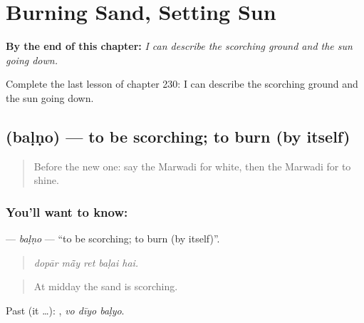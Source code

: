 
\chapter{Burning Sand, Setting Sun}
\label{ch:mw-burning-sand-setting-sun}

\begin{chapteropening}
\textbf{By the end of this chapter:} \emph{I can describe the scorching ground and the sun going down.}

Complete the last lesson of chapter 230: I can describe the scorching ground and the sun going down.
\end{chapteropening}

\section[\texorpdfstring{\mw{बळणो} (baḷṇo)}{बळणो (baḷṇo)}]{ (baḷṇo) — to be scorching; to burn (by itself)}

\label{lesson:MW-C230-balno-scorch}



\begin{quote}
Before the new one: say the Marwadi for white, then the Marwadi for to shine.
\end{quote}

\subsection*{You'll want to know: }
\textbf{} — \emph{baḷṇo} — \textquotedblleft{}to be scorching; to burn (by itself)\textquotedblright{}.

\begin{quote}
    
\end{quote}

\begin{quote}
\emph{dopār mā̃y ret baḷai hai.}
\end{quote}

\begin{quote}
At midday the sand is scorching.
\end{quote}

Past (it …):   , \emph{vo dīyo baḷyo}.

